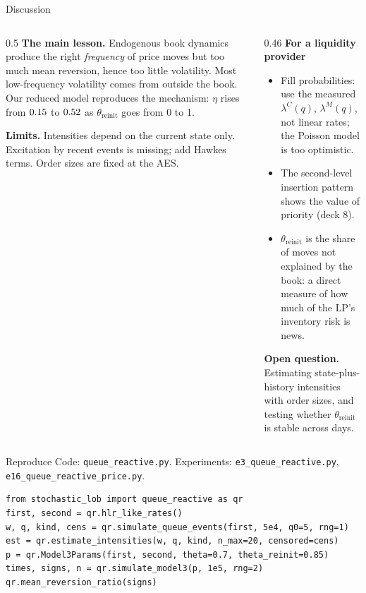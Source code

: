 \documentclass[aspectratio=169,10pt]{beamer}
\begin{document}
\begin{frame}{Discussion}
  \small
  \begin{columns}[T]
    \begin{column}{0.5\textwidth}
      \textbf{The main lesson.} Endogenous book dynamics produce the right \emph{frequency} of price moves but too much mean reversion, hence too little volatility. Most low-frequency volatility comes from outside the book. Our reduced model reproduces the mechanism: $\eta$ rises from $0.15$ to $0.52$ as $\theta_{\mathrm{reinit}}$ goes from 0 to 1.

      \vspace{0.4em}
      \textbf{Limits.} Intensities depend on the current state only. Excitation by recent events is missing; \citet{wu2019queue} add Hawkes terms. Order sizes are fixed at the AES.
    \end{column}
    \begin{column}{0.46\textwidth}
      \textbf{For a liquidity provider}
      \begin{itemize}
        \item Fill probabilities: use the measured $\lambda^C(q)$, $\lambda^M(q)$, not linear rates; the Poisson model is too optimistic.
        \item The second-level insertion pattern shows the value of priority (deck 8).
        \item $\theta_{\mathrm{reinit}}$ is the share of moves not explained by the book: a direct measure of how much of the LP's inventory risk is news.
      \end{itemize}
      \textbf{Open question.} Estimating state-plus-history intensities with order sizes, and testing whether $\theta_{\mathrm{reinit}}$ is stable across days.
    \end{column}
  \end{columns}
\end{frame}

\begin{frame}[fragile]{Reproduce}
  \small
  Code: \texttt{queue\_reactive.py}. Experiments: \texttt{e3\_queue\_reactive.py}, \texttt{e16\_queue\_reactive\_price.py}.
\begin{verbatim}
from stochastic_lob import queue_reactive as qr
first, second = qr.hlr_like_rates()
w, q, kind, cens = qr.simulate_queue_events(first, 5e4, q0=5, rng=1)
est = qr.estimate_intensities(w, q, kind, n_max=20, censored=cens)
p = qr.Model3Params(first, second, theta=0.7, theta_reinit=0.85)
times, signs, n = qr.simulate_model3(p, 1e5, rng=2)
qr.mean_reversion_ratio(signs)
\end{verbatim}
\end{frame}

\deckreferences
\end{document}
